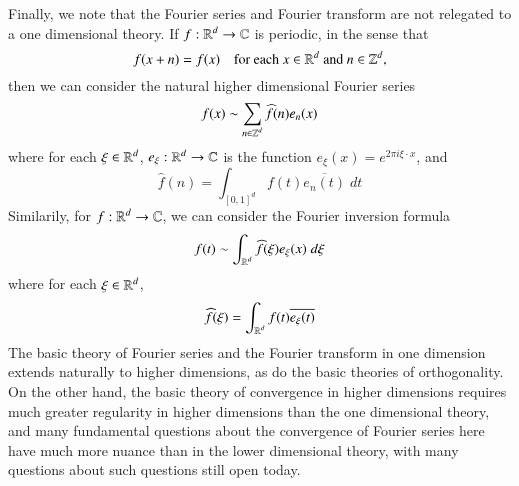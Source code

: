 Finally, we note that the Fourier series and Fourier transform are not relegated to a one dimensional theory. If $f: \operatorname{\mathbb{R}}^d \to \operatorname{\mathbb{C}}$ is periodic, in the sense that
%
\[ f(x + n) = f(x) \quad \text{for each $x \in \operatorname{\mathbb{R}}^d$ and $n \in \operatorname{\mathbb{Z}}^d$}, \]
%
then we can consider the natural higher dimensional Fourier series
%
\[ f(x) \sim \sum_{n \in \operatorname{\mathbb{Z}}^d} \widehat{f}(n) e_n(x) \] 
%
where for each $\xi \in \operatorname{\mathbb{R}}^d$, $e_\xi: \operatorname{\mathbb{R}}^d \to \operatorname{\mathbb{C}}$ is the function $e_\xi(x) = e^{2 \pi i \xi \cdot x}$, and
%
\[ \widehat{f}(n) = \int_{[0,1]^d} f(t) \overline{e_n(t)}\; dt \]
%
Similarily, for $f: \operatorname{\mathbb{R}}^d \to \operatorname{\mathbb{C}}$, we can consider the Fourier inversion formula
%
\[ f(t) \sim \int_{\operatorname{\mathbb{R}}^d} \widehat{f}(\xi) e_\xi(x)\; d\xi \]
%
where for each $\xi \in \operatorname{\mathbb{R}}^d$,
%
\[ \widehat{f}(\xi) = \int_{\operatorname{\mathbb{R}}^d} f(t) \overline{e_\xi(t)} \]
%
The basic theory of Fourier series and the Fourier transform in one dimension extends naturally to higher dimensions, as do the basic theories of orthogonality. On the other hand, the basic theory of convergence in higher dimensions requires much greater regularity in higher dimensions than the one dimensional theory, and many fundamental questions about the convergence of Fourier series here have much more nuance than in the lower dimensional theory, with many questions about such questions still open today.

%

